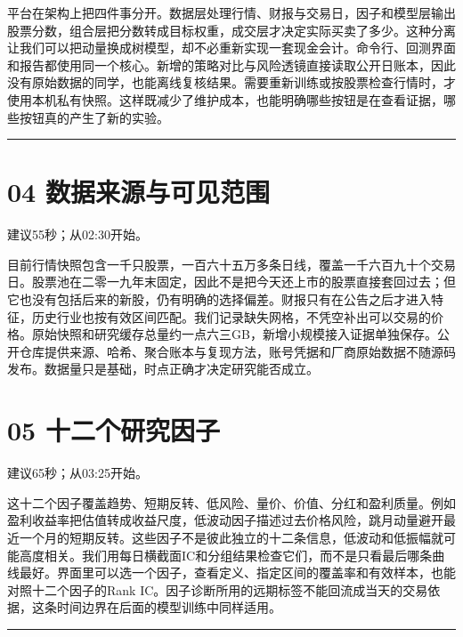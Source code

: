 \documentclass[UTF8,a4paper,12pt]{ctexart}
\begin{document}
平台在架构上把四件事分开。数据层处理行情、财报与交易日，因子和模型层输出股票分数，组合层把分数转成目标权重，成交层才决定实际买卖了多少。这种分离让我们可以把动量换成树模型，却不必重新实现一套现金会计。命令行、回测界面和报告都使用同一个核心。新增的策略对比与风险透镜直接读取公开日账本，因此没有原始数据的同学，也能离线复核结果。需要重新训练或按股票检查行情时，才使用本机私有快照。这样既减少了维护成本，也能明确哪些按钮是在查看证据，哪些按钮真的产生了新的实验。


\vspace{6mm}\noindent\textcolor{accent!40}{\rule{\textwidth}{0.4pt}}\par

\section*{\color{ink}04  数据来源与可见范围}

{\small\color{accent}建议55秒；从02:30开始。}\par

目前行情快照包含一千只股票，一百六十五万多条日线，覆盖一千六百九十个交易日。股票池在二零一九年末固定，因此不是把今天还上市的股票直接套回过去；但它也没有包括后来的新股，仍有明确的选择偏差。财报只有在公告之后才进入特征，历史行业也按有效区间匹配。我们记录缺失网格，不凭空补出可以交易的价格。原始快照和研究缓存总量约一点六三GB，新增小规模接入证据单独保存。公开仓库提供来源、哈希、聚合账本与复现方法，账号凭据和厂商原始数据不随源码发布。数据量只是基础，时点正确才决定研究能否成立。


\newpage
\section*{\color{ink}05  十二个研究因子}

{\small\color{accent}建议65秒；从03:25开始。}\par

这十二个因子覆盖趋势、短期反转、低风险、量价、价值、分红和盈利质量。例如盈利收益率把估值转成收益尺度，低波动因子描述过去价格风险，跳月动量避开最近一个月的短期反转。这些因子不是彼此独立的十二条信息，低波动和低振幅就可能高度相关。我们用每日横截面IC和分组结果检查它们，而不是只看最后哪条曲线最好。界面里可以选一个因子，查看定义、指定区间的覆盖率和有效样本，也能对照十二个因子的Rank IC。因子诊断所用的远期标签不能回流成当天的交易依据，这条时间边界在后面的模型训练中同样适用。


\vspace{6mm}\noindent\textcolor{accent!40}{\rule{\textwidth}{0.4pt}}\par
\end{document}
